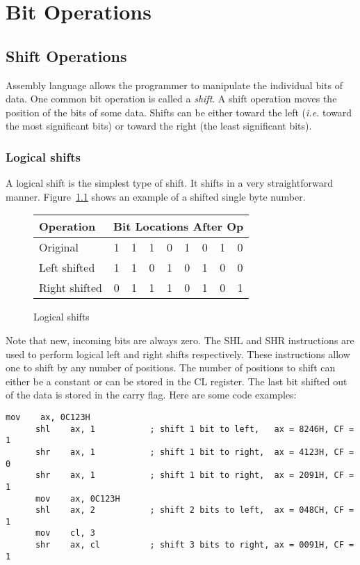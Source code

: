 \chapter{Bit Operations}
\section{Shift Operations}

Assembly language allows the programmer to manipulate the individual bits
of data. One common bit operation is called a \emph{shift}. A shift operation
moves the position of the bits of some data. Shifts can be either toward the
left (\emph{i.e.} toward the most significant bits) or toward the right
(the least significant bits).

\subsection{Logical shifts}

A logical shift is the simplest type of shift. It shifts in a very 
straightforward manner. Figure~\ref{fig:logshifts} shows an example of a
shifted single byte number.
\begin{figure}[h]
\centering

\begin{tabular}{|l|c|c|c|c|c|c|c|c|}
\hline
\textbf{Operation} & \multicolumn{8}{l|}{\textbf{Bit Locations After Op}}  \\      
\hline%
Original      & 1 & 1 & 1 & 0 & 1 & 0 & 1 & 0 \\
\hline%
Left shifted  & 1 & 1 & 0 & 1 & 0 & 1 & 0 & 0 \\
\hline%
Right shifted & 0 & 1 & 1 & 1 & 0 & 1 & 0 & 1 \\
\hline%
\end{tabular}
\caption{Logical shifts \label{fig:logshifts}}
\end{figure}

Note that new, incoming bits are always zero. The {\code SHL}
 and {\code SHR}  instructions are used to
perform logical left and right shifts respectively.  These
instructions allow one to shift by any number of positions. The number
of positions to shift can either be a constant or can be stored in the
{\code CL} register. The last bit shifted out of the data is stored in
the carry flag. Here are some code examples:
\begin{lstlisting}[language={[x86masm]Assembler}]
      mov    ax, 0C123H
      shl    ax, 1           ; shift 1 bit to left,   ax = 8246H, CF = 1
      shr    ax, 1           ; shift 1 bit to right,  ax = 4123H, CF = 0
      shr    ax, 1           ; shift 1 bit to right,  ax = 2091H, CF = 1
      mov    ax, 0C123H
      shl    ax, 2           ; shift 2 bits to left,  ax = 048CH, CF = 1
      mov    cl, 3
      shr    ax, cl          ; shift 3 bits to right, ax = 0091H, CF = 1
\end{lstlisting}

